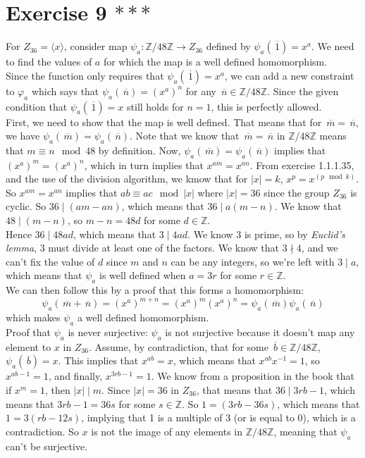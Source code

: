 \documentclass[12pt]{article}
\newcommand{\Z}{\mathbb{Z}}
\newcommand{\olsi}[1]{\,\overline{\!{#1}}}
\begin{document}
    \section*{Exercise 9 $***$}
    For $Z_{36} = \langle x \rangle$,
    consider map $\psi_a: \Z/48\Z \to Z_{36}$
    defined by $\psi_a(\olsi{1}) = x^a$.
    We need to find the values of $a$ for which the map is a well
    defined homomorphism. \\
    Since the function only requires that $\psi_a(\olsi{1}) = x^a$,
    we can add a new constraint to $\varphi_a$ which says that 
    $\psi_a(\olsi{n}) = (x^a)^n$ for any $\olsi{n} \in \Z/48\Z$.
    Since the given condition that $\psi_a(\olsi{1}) = x$
    still holds for $n = 1$, this is perfectly allowed. \\
    First, we need to show that the map is well defined.
    That means that for $\olsi{m} = \olsi{n}$,
    we have $\psi_a(\olsi{m}) = \psi_a(\olsi{n})$.
    Note that we know that $\olsi{m} = \olsi{n}$ in $\Z/48\Z$
    means that $m \equiv n \mod 48$ by definition.
    Now, $\psi_a(\olsi{m}) = \psi_a(\olsi{n})$
    implies that $(x^a)^m = (x^a)^n$,
    which in turn implies that $x^{am} = x^{an}$.
    From exercise 1.1.1.35, and the use of the division
    algorithm, we kmow that for $|x| = k$, $x^p = x^{(p \mod k)}$.
    So $x^{am} = x^{an}$ implies that $ab \equiv ac \mod |x|$
    where $|x| = 36$ since the group $Z_{36}$ is cyclic.
    So $36 \mid (am - an)$,
    which means that $36 \mid a(m - n)$.
    We know that $48 \mid (m - n)$,
    so $m - n = 48d$ for some $d \in \Z$. \\
    Hence $36 \mid 48ad$,
    which means that $3 \mid 4ad$.
    We know 3 is prime, so by \textit{Euclid's lemma},
    3 must divide at least one of the factors.
    We know that $3 \nmid 4$,
    and we can't fix the value of $d$ since $m$ and $n$
    can be any integers,
    so we're left with $3 \mid a$,
    which means that $\psi_a$ is well defined when
    $a = 3r$ for some $r \in \Z$. \\
    We can then follow this by a proof that this forms a homomorphism:
    \[ \psi_a(\olsi{m} + \olsi{n}) = (x^a)^{m + n}
    = (x^a)^m(x^a)^n
    = \psi_a(\olsi{m})\psi_a(\olsi{n})  \]
    which makes $\psi_a$ a well defined homomorphism. \\
    Proof that $\psi_a$ is never surjective:
    $\psi_a$ is not surjective because it doesn't map any element
    to $x$ in $Z_{36}$.
    Assume, by contradiction, that for some $\olsi{b} \in \Z/48\Z$,
    $\psi_a(\olsi{b}) = x$.
    This implies that $x^{ab} = x$,
    which means that $x^{ab}x^{-1} = 1$,
    so $x^{ab - 1} = 1$,
    and finally, $x^{3rb - 1} = 1$.
    We know from a proposition in the book that
    if $x^m = 1$, then $|x| \mid m$.
    Since $|x| = 36$ in $Z_{36}$,
    that means that $36 \mid 3rb - 1$,
    which means that $3rb - 1 = 36s$ for some $s \in \Z$.
    So $1 = (3rb - 36s)$,
    which means that $1 = 3(rb - 12s)$,
    implying that 1 is a multiple of 3 (or is equal to 0),
    which is a contradiction.
    So $x$ is not the image of any elements in $\Z/48\Z$,
    meaning that $\psi_a$ can't be surjective.
\end{document}
